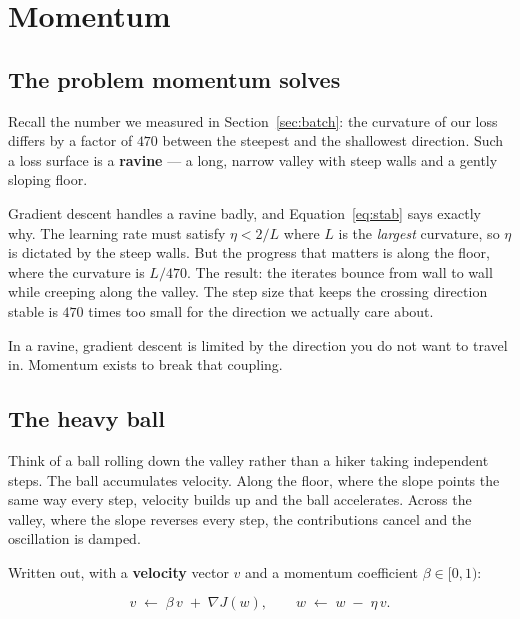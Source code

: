 \documentclass[11pt]{article}
\begin{document}
\newpage
\section{Momentum}
\label{sec:momentum}

\subsection{The problem momentum solves}

Recall the number we measured in Section~\ref{sec:batch}: the curvature of our
loss differs by a factor of $470$ between the steepest and the shallowest
direction. Such a loss surface is a \textbf{ravine} --- a long, narrow valley
with steep walls and a gently sloping floor.

Gradient descent handles a ravine badly, and Equation~\eqref{eq:stab} says
exactly why. The learning rate must satisfy $\eta < 2/L$ where $L$ is the
\emph{largest} curvature, so $\eta$ is dictated by the steep walls. But the
progress that matters is along the floor, where the curvature is $L/470$. The
result: the iterates bounce from wall to wall while creeping along the valley.
The step size that keeps the crossing direction stable is $470$ times too small
for the direction we actually care about.

\begin{keyidea}
In a ravine, gradient descent is limited by the direction you do not want to
travel in. Momentum exists to break that coupling.
\end{keyidea}

\subsection{The heavy ball}

Think of a ball rolling down the valley rather than a hiker taking independent
steps. The ball accumulates velocity. Along the floor, where the slope points
the same way every step, velocity builds up and the ball accelerates. Across
the valley, where the slope reverses every step, the contributions cancel and
the oscillation is damped.

Written out, with a \textbf{velocity} vector $v$ and a momentum coefficient
$\beta \in [0,1)$:

\begin{equation}
  \label{eq:mom}
  v \;\leftarrow\; \beta\, v \;+\; \nabla J(w),
  \qquad
  w \;\leftarrow\; w \;-\; \eta\, v .
\end{equation}
\end{document}
